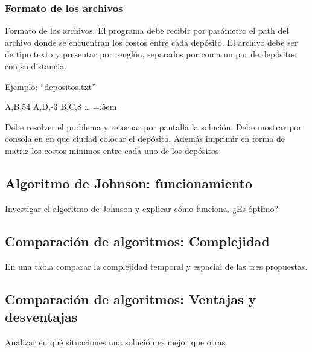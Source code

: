 \documentclass[titlepage,a4paper]{article}
\newenvironment{lcverbatim}
 {\SaveVerbatim{cverb}}
 {\endSaveVerbatim
  \flushleft\fboxrule=0pt\fboxsep=.5em
  \colorbox{cverbbg}{%
    \makebox[\dimexpr\linewidth-2\fboxsep][l]{\BUseVerbatim{cverb}}%
  }
  \endflushleft
}
\begin{document}
\subsubsection{Formato de los archivos}
Formato de los archivos:
El programa debe recibir por parámetro el path del archivo donde se encuentran los
costos entre cada depósito. El archivo debe ser de tipo texto y presentar por renglón,
separados por coma un par de depósitos con su distancia.

Ejemplo: “depositos.txt”

\begin{lcverbatim}
    A,B,54
    A,D,-3
    B,C,8
    …
\end{lcverbatim}

Debe resolver el problema y retornar por pantalla la solución. Debe mostrar por
consola en en que ciudad colocar el depósito. Además imprimir en forma de matriz los
costos mínimos entre cada uno de los depósitos.


\newpage\subsection{Algoritmo de Johnson: funcionamiento}\label{sec:parte1_1}
\begin{tcolorbox}[colback=blue!5!white,colframe=blue!75!black,title=Enunciado 1.1]
    Investigar el algoritmo de Johnson y explicar cómo funciona. ¿Es óptimo?
\end{tcolorbox}

\newpage\subsection{Comparación de algoritmos: Complejidad}\label{sec:parte1_2}
\begin{tcolorbox}[colback=blue!5!white,colframe=blue!75!black,title=Enunciado 1.2]
    En una tabla comparar la complejidad temporal y espacial de las tres propuestas.
\end{tcolorbox}

\newpage\subsection{Comparación de algoritmos: Ventajas y desventajas}\label{sec:parte1_3}
\begin{tcolorbox}[colback=blue!5!white,colframe=blue!75!black,title=Enunciado 1.3]
    Analizar en qué situaciones una solución es mejor que otras.
\end{tcolorbox}
\end{document}
